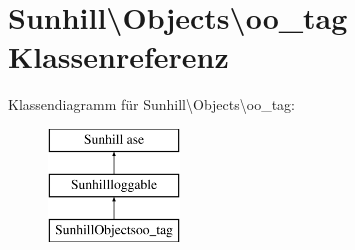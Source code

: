 \hypertarget{classSunhill_1_1Objects_1_1oo__tag}{}\section{Sunhill\textbackslash{}Objects\textbackslash{}oo\+\_\+tag Klassenreferenz}
\label{classSunhill_1_1Objects_1_1oo__tag}
Klassendiagramm für Sunhill\textbackslash{}Objects\textbackslash{}oo\+\_\+tag\+:\begin{figure}[H]
\begin{center}
\leavevmode
\includegraphics[height=3.000000cm]{dc/dfb/classSunhill_1_1Objects_1_1oo__tag}
\end{center}
\end{figure}
